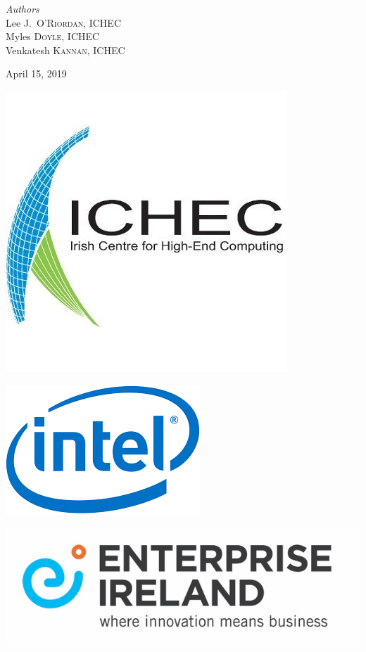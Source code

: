 \documentclass[11pt]{article}
\begin{document}
\begin{titlepage}
\vfill
\begin{center} \large
\emph{Authors}\\[0.5cm]
Lee J.~\textsc{O'Riordan}, ICHEC\\[0.2cm]
Myles \textsc{Doyle}, ICHEC\\[0.2cm]
Venkatesh \textsc{Kannan}, ICHEC
\end{center}
\vfill
{\large April 15, 2019}\\[1cm] 
\vfill
\hfill
\begin{minipage}{0.4\textwidth}
\includegraphics[scale=0.3]{ichec_logo.jpeg}
\end{minipage}
\hfill
\begin{minipage}{0.4\textwidth}
\includegraphics[scale=0.3]{intel_logo.png}
\end{minipage}
\vfill
\includegraphics[scale=0.3]{ei_logo.JPG}
\vfill
\end{titlepage}
\end{document}
